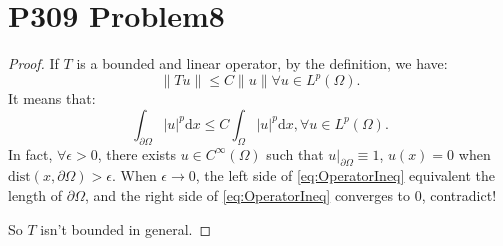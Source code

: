 \documentclass[a4paper]{ctexart}
\newcommand{\dif}{\mathrm{d}}
\begin{document}
\section*{P309 Problem8}
\begin{proof}
    If $T$ is a bounded and linear operator, by the definition, we have:
    \begin{equation}
        \label{eq:BoundedOp}
        \|Tu\|\le C\|u\|\forall u\in L^{p}(\Omega).
    \end{equation}
    It means that:
    \begin{equation}
        \label{eq:OperatorIneq}
        \int_{\partial \Omega}|u|^{p}\dif x\le C\int_{\Omega}|u|^{p}\dif x,\forall u\in L^{p}(\Omega).
    \end{equation}
    In fact, $\forall \epsilon>0$, there exists $u\in C^{\infty}(\Omega)$ such that $u|_{\partial\Omega}\equiv 1$, $u(x)=0$ when $\text{dist}(x,\partial\Omega)>\epsilon$. When $\epsilon\rightarrow 0$, the left side of \eqref{eq:OperatorIneq} equivalent the length of $\partial\Omega$, and the right side of \eqref{eq:OperatorIneq} converges to 0, contradict!

    So $T$ isn't bounded in general.
\end{proof}
\end{document}
